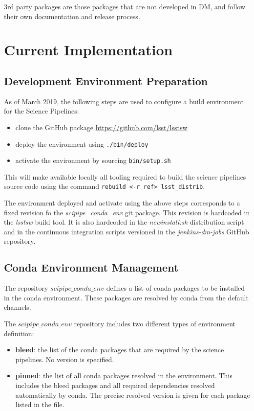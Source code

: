 3rd party packages are those packages that are not developed in DM, and follow their own documentation and release process.


\newpage
\section{Current Implementation} \label{sec:actual}

\subsection{Development Environment Preparation} \label{sec:envset} 
As of March 2019, the following steps are used to configure a build environment for the Science Pipelines:

\begin{itemize}
\item clone the GitHub package \url{https://github.com/lsst/lsstsw}
\item deploy the environment using \texttt{./bin/deploy}
\item activate the environment by sourcing \texttt{bin/setup.sh}
\end{itemize}

This will make available locally all tooling required to build the science pipelines source code using the command \texttt{rebuild <-r ref> lsst\_distrib}.

The environment deployed and activate using the above steps corresponds to a fixed revision fo the \textit{scipipe\_conda\_env} git package.
This revision is hardcoded in the \textit{lsstsw} build tool. It is also hardcoded in the \textit{newinstall.sh} distribution script and in the continuous integration scripts versioned in the \textit{jenkins-dm-jobs} GitHub repository.


\subsection{Conda Environment Management} \label{sec:condaenv}

The repository $scipipe\_conda\_env$ defines a list of conda packages to be installed in the conda environment.
These packages are resolved by conda from the default channels.

The $scipipe\_conda\_env$ repository includes two different types of environment definition:

\begin{itemize}
\item {\bf bleed}: the list of the conda packages that are required by the science pipelines. No version is specified.
\item {\bf pinned}: the list of all conda packages resolved in the environment. This includes the bleed packages and all required dependencies resolved automatically by conda. The precise resolved version is given for each package listed in the file.
\end{itemize}

